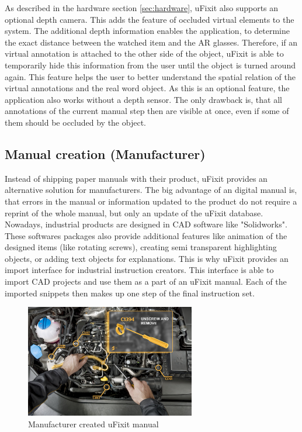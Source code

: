 As described in the hardware section \ref{sec:hardware}, uFixit also supports an optional depth camera. This adds the feature of occluded virtual elements to the system. The additional depth information enables the application, to determine the exact distance between the watched item and the AR glasses. Therefore, if an virtual annotation is attached to the other side of the object, uFixit is able to temporarily hide this information from the user until the object is turned around again. This feature helps the user to better understand the spatial relation of the virtual annotations and the real word object.
As this is an optional feature, the application also works without a depth sensor. The only drawback is, that all annotations of the current manual step then are visible at once, even if some of them should be occluded by the object.


\subsection{Manual creation (Manufacturer)}
Instead of shipping paper manuals with their product, uFixit provides an alternative solution for manufacturers. The big advantage of an digital manual is, that errors in the manual or information updated to the product do not require a reprint of the whole manual, but only an update of the uFixit database. Nowadays, industrial products are designed in CAD software like "Solidworks". These softwares packages also provide additional features like animation of the designed items (like rotating screws), creating semi transparent highlighting objects, or adding text objects for explanations. This is why uFixit provides an import interface for industrial instruction creators. This interface is able to import CAD projects and use them as a part of an uFixit manual. Each of the imported snippets then makes up one step of the final instruction set.

\begin{figure}[H]
		\includegraphics[width=0.66\textwidth]{../images/manufacturer.jpg}
		\centering
		\caption{Manufacturer created uFixit manual}
		\label{fig:cardBoard}
\end{figure}


